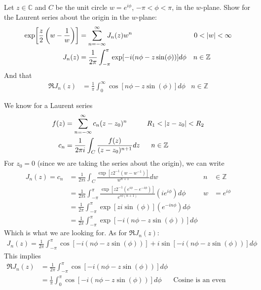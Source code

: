 \documentclass[12pt, english]{book}
\makeatletter
\renewenvironment{proof}[1][\proofname]{\par
	\pushQED{\qed}%
	\normalfont \topsep6\p@\@plus6\p@\relax
	\list{}{%
		\settowidth{\leftmargin}{\itshape\proofname:\hskip\labelsep}%
		\setlength{\labelwidth}{0pt}%
		\setlength{\itemindent}{-\leftmargin}%
	}%
	\item[\hskip\labelsep\itshape#1\@addpunct{:}]\ignorespaces
	}{ \popQED\endlist\@endpefalse}
\makeatother
\begin{document}
	\begin{example}
		Let \(z \in \mathbb{C}\) and \(C\) be the unit circle \(w = e^{i\phi}\), \(-\pi<\phi<\pi\), in the \(w\)-plane. Show for the Laurent series about the origin in the \(w\)-plane:
		\begin{align*}
			\exp[\frac{z}{2}\left(w - \frac{1}{w}\right)]
			&= \sum_{n=-\infty}^{\infty} J_n(z)w^n	&	0&<\abs{w}<\infty \\
			J_n (z) 
			&= \frac{1}{2\pi} \int_{-\pi}^{\pi} \exp[-i(n\phi - z\sin(\phi))] d \phi 
				&	n &\in \mathbb{Z}
		\end{align*}
		And that 
		\begin{align}
			\Re{J_n(z)} &= \frac{1}{\pi} \int_{0}^{\infty} \cos[n\phi - z \sin(\phi)] d\phi
				& n \in \mathbb{Z}
		\end{align}
		\begin{proof}
			{\color{Grey}
			We know for a Laurent series
			\begin{align*}
				f(z) &= \sum_{n=-\infty}^{\infty} c_n(z-z_0)^n & R_1 &< \abs{z-z_0} < R_2 \\
				c_n &= \frac{1}{2\pi i} \int_{C} \frac{f(z)}{(z-z_0)^{n+1}} dz & n &\in \mathbb{Z}
			\end{align*}
			For \(z_0 = 0\) (since we are taking the series about the origin), we can write
			\begin{align*}
				J_n(z) = c_n 
				&= \frac{1}{2\pi i} \int_{C} \frac{\exp[z2^{-1}(w - w^{-1})]}{w^{n+1}} dw 
					& n &\in \mathbb{Z} \\
				&= \frac{1}{2\pi i} \int_{-\pi}^{\pi} 
				   \frac{\exp[z2^{-1}(e^{i\phi} - e^{-i\phi})]}{e^{i\phi(n+1)}} (ie^{i\phi}) d\phi & w &= e^{i\phi} \\
				&= \frac{1}{2\pi} \int_{-\pi}^{\pi} 
				\exp[zi\sin(\phi)] (e^{-in\phi}) d\phi \\
				&= \frac{1}{2\pi} \int_{-\pi}^{\pi} 
				\exp[-i(n\phi - z\sin(\phi))]  d\phi 
			\end{align*}
			Which is what we are looking for. As for \(\Re{J_n(z)}\):
			\begin{align*}
				J_n(z) = \frac{1}{2\pi} \int_{-\pi}^{\pi} 
				\cos[-i(n\phi - z\sin(\phi))] + i\sin [-i(n\phi - z\sin(\phi))] d\phi 
			\end{align*}
			This implies
			\begin{align*}
				\Re{J_n(z)} 
				&= \frac{1}{2\pi} \int_{-\pi}^{\pi}	\cos[-i(n\phi - z\sin(\phi))] d\phi \\
				&= \frac{1}{\pi} \int_{0}^{\pi}	\cos[-i(n\phi - z\sin(\phi))] d\phi 
					& \text{Cosine is an even function}
			\end{align*}
			}
		\end{proof}
	\end{example}
\end{document}
